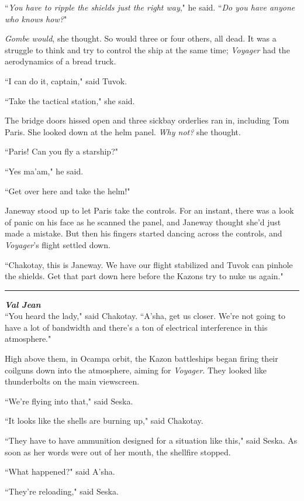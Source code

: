 \documentclass[twoside,letterpaper,12pt]{memoir}
\begin{document}
``\textit{You have to ripple the shields just the right way}," he said. ``\textit{Do you have anyone who knows how?}"

\textit{Gombe would}, she thought. So would three or four others, all dead. It was a struggle to think and try to control the ship at the same time; \textit{Voyager} had the aerodynamics of a bread truck.

``I can do it, captain," said Tuvok.

``Take the tactical station," she said.

The bridge doors hissed open and three sickbay orderlies ran in, including Tom Paris. She looked down at the helm panel. \textit{Why not?} she thought.

``Paris! Can you fly a starship?"

``Yes ma'am," he said.

``Get over here and take the helm!"

Janeway stood up to let Paris take the controls. For an instant, there was a look of panic on his face as he scanned the panel, and Janeway thought she'd just made a mistake. But then his fingers started dancing across the controls, and \textit{Voyager}'s flight settled down.

``Chakotay, this is Janeway. We have our flight stabilized and Tuvok can pinhole the shields. Get that part down here before the Kazons try to nuke us again."

\fancybreak{\rule{3cm}{0.4 pt}}
\noindent\textit{\textbf{Val Jean}}\\

``You heard the lady," said Chakotay. ``A'sha, get us closer. We're not going to have a lot of bandwidth and there's a ton of electrical interference in this atmosphere."

High above them, in Ocampa orbit, the Kazon battleships began firing their coilguns down into the atmosphere, aiming for \textit{Voyager}. They looked like thunderbolts on the main viewscreen.

``We're flying into that," said Seska.

``It looks like the shells are burning up," said Chakotay.

``They have to have ammunition designed for a situation like this," said Seska. As soon as her words were out of her mouth, the shellfire stopped.

``What happened?" said A'sha.

``They're reloading," said Seska.
\end{document}
